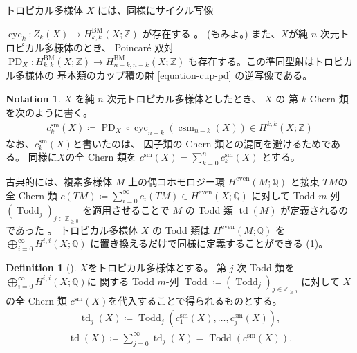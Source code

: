 \documentclass[a4paper,dvipdfmx,reqno,12pt]{amsart}
\theoremstyle{definition}
\newtheorem{definition}[theorem]{Definition}
\newtheorem{notation}[theorem]{Notation}
\newcommand{\deq}{\coloneqq}
\newcommand{\opn}[1]{\operatorname{#1}}
\numberwithin{equation}{section}
\begin{document}
トロピカル多様体 $X$ には、同様にサイクル写像

$\opn{cyc}_k\colon Z_k(X)\to H^{\mathrm{BM}}_{k,k}(X;\mathbb{Z})$
が存在する
\cite{gross2019sheaftheoretic}。
(\cite[Definition 4.13]{MR3894860}もみよ。)
また、$X$が純 $n$ 次元トロピカル多様体のとき、
Poincar\'e 双対
$\opn{PD}_X\colon H_{k,k}^{\opn{BM}}(X;\mathbb{Z})
\to H_{n-k,n-k}^{\opn{BM}}(X;\mathbb{Z})$
も存在する。この準同型射はトロピカル多様体の
基本類のカップ積の射 \eqref{equation-cup-pd}
の逆写像である。

\begin{notation}
$X$ を純 $n$ 次元トロピカル多様体としたとき、
$X$ の 第 $k$ Chern 類を次のように書く。 
\begin{align}
c_{k}^{\mathrm{sm}}(X)\deq
\opn{PD}_X\circ \opn{cyc}_{n-k}(\opn{csm}_{n-k}(X))
\in H^{k,k}(X;\mathbb{Z})
\end{align}
なお、$c_{k}^{\mathrm{sm}}(X)$と書いたのは、
因子類の Chern 類との混同を避けるためである。
同様に$X$の全 Chern 類を
$c^{\mathrm{sm}}(X)=\sum_{k=0}^{n} c_{k}^{\mathrm{sm}}(X)$
とする。
\end{notation}

古典的には、複素多様体 $M$ 上の偶コホモロジー環
$H^{\mathrm{even}}(M;\mathbb{Q})$
と接束 $TM$の全 Chern 類 
$c(TM)\deq \sum_{i=0}^{\infty}c_i(TM)\in 
H^{\mathrm{even}}(X;\mathbb{Q})$
に対して
Todd $m$-列 $(\opn{Todd}_j)_{j\in \mathbb{Z}_{\geq 0}}$
を適用させることで $M$ の Todd 類
$\opn{td}(M)$
が定義されるのであった
\cite[]{MR1335917}。
トロピカル多様体 $X$ の Todd 類は
$H^{\mathrm{even}}(M;\mathbb{Q})$ を
$\bigoplus_{i=0}^{\infty} H^{i,i}(X;\mathbb{Q})$
に置き換えるだけで同様に定義することができる
(\cref{definition-tropical-todd})。

\begin{definition}[{\cite{demedrano2023chern}}]
\label{definition-tropical-todd}
$X$をトロピカル多様体とする。
第 $j$ 次 Todd 類を
$\bigoplus_{i=0}^{\infty} H^{i,i}(X;\mathbb{Q})$に
関する Todd $m$-列 $\opn{Todd}\deq (\opn{Todd}_j)_{j\in \mathbb{Z}_{\geq 0}}$
に対して
$X$ の全 Chern 類
$c^{\mathrm{sm}}(X)$を代入することで得られるものとする。
\begin{align}
\opn{td}_j(X)\deq \opn{Todd}_j(c_{1}^{\mathrm{sm}}(X),
\ldots,c_{j}^{\mathrm{sm}}(X)),
\end{align}
\begin{align}
\opn{td}(X)\deq \sum_{j=0}^{\infty}\opn{td}_j(X)=
\opn{Todd}(c^{\mathrm{sm}}(X)).
\end{align}

\end{definition}
\end{document}
